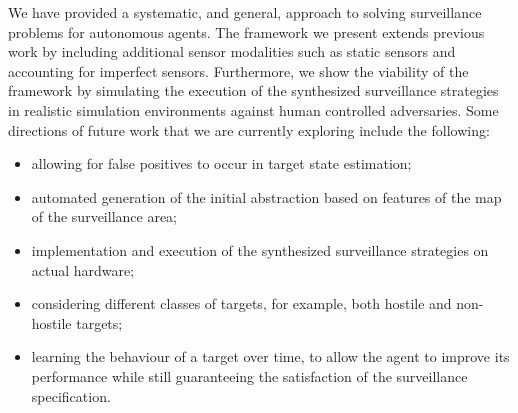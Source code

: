 We have provided a systematic, and general, approach to solving surveillance problems for autonomous agents. The framework we present extends previous work by including additional sensor modalities such as static sensors and accounting for imperfect sensors. Furthermore, we show the viability of the framework by simulating the execution of the synthesized surveillance strategies in realistic simulation environments against human controlled adversaries. Some directions of future work that we are currently exploring include the following:

\begin{itemize}

\item allowing for false positives to occur in target state estimation;
\item automated generation of the initial abstraction based on features of the map of the surveillance area;
    \item implementation and execution of the synthesized surveillance strategies on actual hardware;
    \item considering different classes of targets, for example, both hostile and non-hostile targets;
    \item learning the behaviour of a target over time, to allow the agent to improve its performance while still guaranteeing the satisfaction of the surveillance specification. 
\end{itemize}





